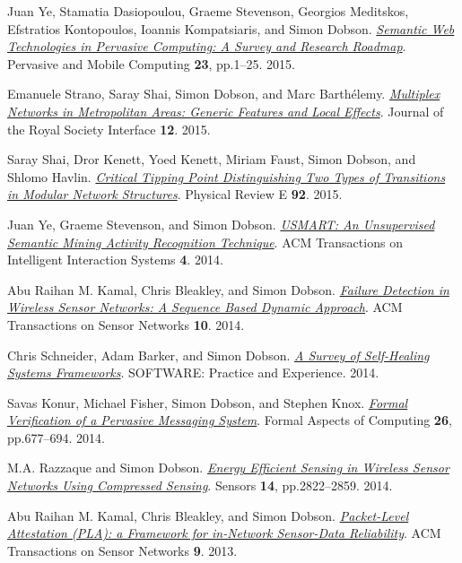 \documentclass[11pt]{article}
\begin{document}
\label{org7ce2ae7}Juan Ye, Stamatia Dasiopoulou, Graeme Stevenson, Georgios Meditskos, Efstratios Kontopoulos, Ioannis Kompatsiaris, and Simon Dobson.  \emph{\href{https://dx.doi.org//10.1016/j.pmcj.2014.12.009}{Semantic Web Technologies in Pervasive Computing: A Survey and Research Roadmap}}. Pervasive and Mobile Computing \textbf{23}, pp.1–25. 2015.

\label{orgff11459}Emanuele Strano, Saray Shai, Simon Dobson, and Marc Barthélemy.  \emph{\href{https://dx.doi.org//10.1098/rsif.2015.0651}{Multiplex Networks in Metropolitan Areas: Generic Features and Local Effects}}. Journal of the Royal Society Interface \textbf{12}. 2015.

\label{org406103e}Saray Shai, Dror Kenett, Yoed Kenett, Miriam Faust, Simon Dobson, and Shlomo Havlin.  \emph{\href{https://dx.doi.org//10.1103/PhysRevE.92.062805}{Critical Tipping Point Distinguishing Two Types of Transitions in Modular Network Structures}}. Physical Review E \textbf{92}. 2015.

\label{org34a709d}Juan Ye, Graeme Stevenson, and Simon Dobson.  \emph{\href{https://dx.doi.org///10.1145/2662870}{USMART: An Unsupervised Semantic Mining Activity Recognition Technique}}. ACM Transactions on Intelligent Interaction Systems \textbf{4}. 2014.

\label{orga5c481a}Abu Raihan M. Kamal, Chris Bleakley, and Simon Dobson.  \emph{\href{https://dx.doi.org//10.1145/2530526}{Failure Detection in Wireless Sensor Networks: A Sequence Based Dynamic Approach}}. ACM Transactions on Sensor Networks \textbf{10}. 2014.

\label{org1966fb3}Chris Schneider, Adam Barker, and Simon Dobson.  \emph{\href{https://dx.doi.org//10.1002/spe.2250}{A Survey of Self-Healing Systems Frameworks}}. SOFTWARE: Practice and Experience. 2014.

\label{org5290957}Savas Konur, Michael Fisher, Simon Dobson, and Stephen Knox.  \emph{\href{https://dx.doi.org//10.1007/s00165-013-0277-4}{Formal Verification of a Pervasive Messaging System}}. Formal Aspects of Computing \textbf{26}, pp.677–694. 2014.

\label{org7e1948c}M.A. Razzaque and Simon Dobson.  \emph{\href{https://dx.doi.org//10.3390/s140202822}{Energy Efficient Sensing in Wireless Sensor Networks Using Compressed Sensing}}. Sensors \textbf{14}, pp.2822–2859. 2014.

\label{org1e2e6fe}Abu Raihan M. Kamal, Chris Bleakley, and Simon Dobson.  \emph{\href{https://dx.doi.org//10.1145/2422966.2422976}{Packet-Level Attestation (PLA): a Framework for in-Network Sensor-Data Reliability}}. ACM Transactions on Sensor Networks \textbf{9}. 2013.
\end{document}
